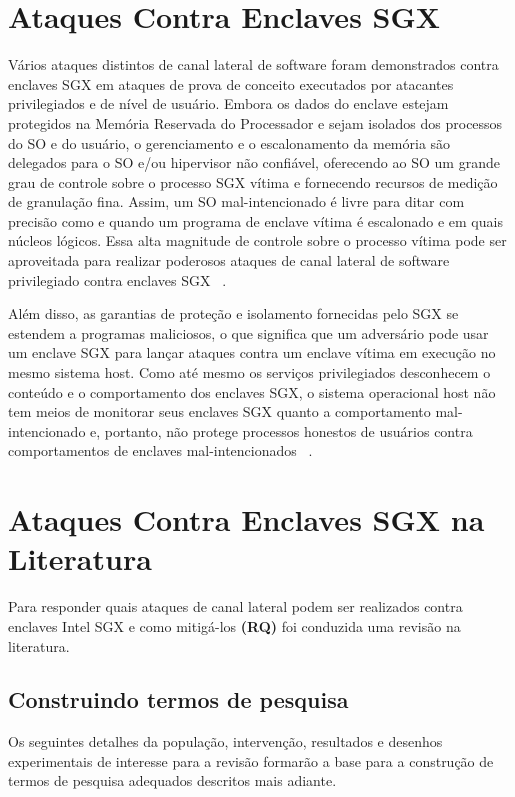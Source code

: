 \documentclass[review]{elsarticle}
\begin{document}
\section{Ataques Contra Enclaves SGX}

Vários ataques distintos de canal lateral de software foram demonstrados contra enclaves SGX em ataques de prova de conceito executados por atacantes privilegiados e de nível de usuário. Embora os dados do enclave estejam protegidos na Memória Reservada do Processador e sejam isolados dos processos do SO e do usuário, o gerenciamento e o escalonamento da memória são delegados para o SO e/ou hipervisor não confiável, oferecendo ao SO um grande grau de controle sobre o processo SGX vítima e fornecendo recursos de medição de granulação fina. Assim, um SO mal-intencionado é livre para ditar com precisão como e quando um programa de enclave vítima é escalonado e em quais núcleos lógicos. Essa alta magnitude de controle sobre o processo vítima pode ser aproveitada para realizar poderosos ataques de canal lateral de software privilegiado contra enclaves SGX ~\cite{costan_intel_2016}.

Além disso, as garantias de proteção e isolamento fornecidas pelo SGX se estendem a programas maliciosos, o que significa que um adversário pode usar um enclave SGX para lançar ataques contra um enclave vítima em execução no mesmo sistema host. Como até mesmo os serviços privilegiados desconhecem o conteúdo e o comportamento dos enclaves SGX, o sistema operacional host não tem meios de monitorar seus enclaves SGX quanto a comportamento mal-intencionado e, portanto, não protege processos honestos de usuários contra comportamentos de enclaves mal-intencionados ~\cite{costan_intel_2016, schwarz_malware_2017}.

\section{Ataques Contra Enclaves SGX na Literatura}

Para responder quais ataques de canal lateral podem ser realizados contra enclaves Intel SGX e como mitigá-los \textbf{(RQ)} foi conduzida uma revisão na literatura.

\subsection {Construindo termos de pesquisa}

Os seguintes detalhes da população, intervenção, resultados e desenhos experimentais de interesse para a revisão formarão a base para a construção de termos de pesquisa adequados descritos mais adiante.
\end{document}
